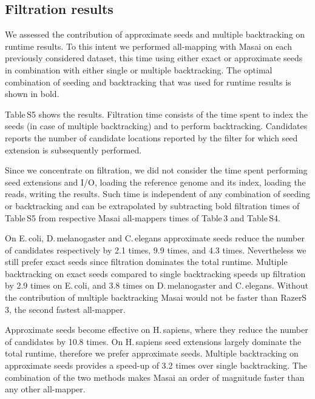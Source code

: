 \subsection{Filtration results}

We assessed the contribution of approximate seeds and multiple backtracking on runtime results.
To this intent we performed all-mapping with Masai on each previously considered dataset, this time using either exact or approximate seeds in combination with either single or multiple backtracking.
The optimal combination of seeding and backtracking that was used for runtime results is shown in bold.

Table\,S5 shows the results.
Filtration time consists of the time spent to index the seeds (in case of multiple backtracking) and to perform backtracking.
Candidates reports the number of candidate locations reported by the filter for which seed extension is subsequently performed.

Since we concentrate on filtration, we did not consider the time spent performing seed extensions and I/O, \ie loading the reference genome and its index, loading the reads, writing the results.
Such time is independent of any combination of seeding or backtracking and can be extrapolated by subtracting bold filtration times of Table\,S5 from respective Masai all-mappers times of Table\,3 and Table\,S4.

On E.\,coli, D.\,melanogaster and C.\,elegans approximate seeds reduce the number of candidates respectively by 2.1 times, 9.9 times, and 4.3 times.
Nevertheless we still prefer exact seeds since filtration dominates the total runtime.
Multiple backtracking on exact seeds compared to single backtracking speeds up filtration by 2.9 times on E.\,coli, and 3.8 times on D.\,melanogaster and C.\,elegans.
Without the contribution of multiple backtracking Masai would not be faster than RazerS\,3, the second fastest all-mapper.

Approximate seeds become effective on H.\,sapiens, where they reduce the number of candidates by 10.8 times. 
On H.\,sapiens seed extensions largely dominate the total runtime, therefore we prefer approximate seeds.
Multiple backtracking on approximate seeds provides a speed-up of 3.2 times over single backtracking.
The combination of the two methods makes Masai an order of magnitude faster than any other all-mapper.

